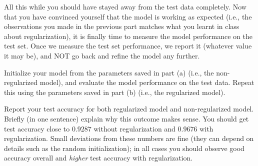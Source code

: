 \item {}
All this while you should have stayed away from the test data completely. Now that
you have convinced yourself that the model is working as expected (i.e., the
observations you made in the previous part matches what you learnt in class
about regularization), it is finally time to measure the model performance on
the test set. Once we measure the test set performance, we report it (whatever
value it may be), and NOT go back and refine the model any further.

Initialize your model from the parameters saved in part (a) (i.e., the non-regularized
model), and evaluate the model performance on the test data. Repeat this using the
parameters saved in part (b) (i.e., the regularized model).

Report your test accuracy for both regularized model and non-regularized model.  
Briefly (in one sentence) explain why this outcome makes sense.
You should get test accuracy close to $0.9287$ without regularization and $0.9676$ with
regularization. Small deviations from these numbers are fine (they can depend on details such as
the random initialization); in all cases you should observe good accuracy overall and \emph{higher}
test accuracy with regularization.